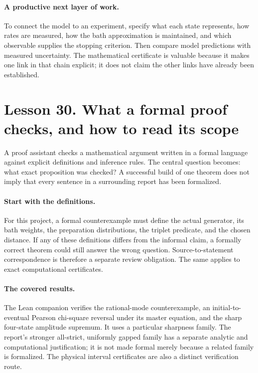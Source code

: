\paragraph{A productive next layer of work.}
To connect the model to an experiment, specify what each state represents,
how rates are measured, how the bath approximation is maintained, and which
observable supplies the stopping criterion. Then compare model predictions
with measured uncertainty. The mathematical certificate is valuable because
it makes one link in that chain explicit; it does not claim the other links
have already been established.

\clearpage
\section*{Lesson 30. What a formal proof checks, and how to read its scope}
A proof assistant checks a mathematical argument written in a formal
language against explicit definitions and inference rules. The central
question becomes: what exact proposition was checked? A successful build
of one theorem does not imply that every sentence in a surrounding report
has been formalized.

\paragraph{Start with the definitions.}
For this project, a formal counterexample must define the actual generator,
its bath weights, the preparation distributions, the triplet predicate,
and the chosen distance. If any of these definitions differs from the
informal claim, a formally correct theorem could still answer the wrong
question. Source-to-statement correspondence is therefore a separate
review obligation. The same applies to exact computational certificates.

\paragraph{The covered results.}
The Lean companion verifies the rational-mode counterexample, an
initial-to-eventual Pearson chi-square reversal under its master equation,
and the sharp four-state amplitude supremum. It uses a particular sharpness
family. The report's stronger all-strict, uniformly gapped family has a
separate analytic and computational justification; it is not made formal
merely because a related family is formalized. The physical interval
certificates are also a distinct verification route.

